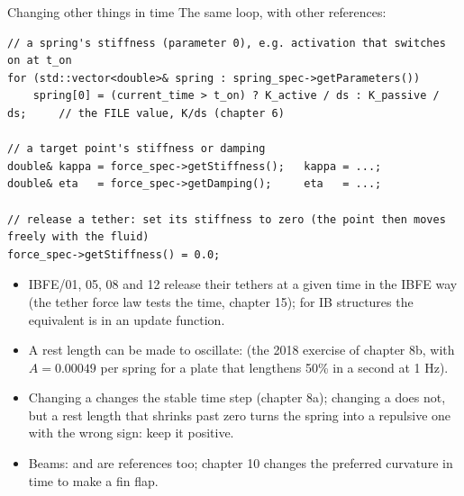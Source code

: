 \documentclass[aspectratio=169,11pt]{beamer}
\begin{document}
\begin{frame}[fragile]{Changing other things in time}
\label{fr:other}
\small The same loop, with other references:
\begin{lstlisting}[style=cpptiny]
// a spring's stiffness (parameter 0), e.g. activation that switches on at t_on
for (std::vector<double>& spring : spring_spec->getParameters())
    spring[0] = (current_time > t_on) ? K_active / ds : K_passive / ds;     // the FILE value, K/ds (chapter 6)

// a target point's stiffness or damping
double& kappa = force_spec->getStiffness();   kappa = ...;
double& eta   = force_spec->getDamping();     eta   = ...;

// release a tether: set its stiffness to zero (the point then moves freely with the fluid)
force_spec->getStiffness() = 0.0;
\end{lstlisting}
\begin{itemize}\footnotesize
  \item IBFE/01, 05, 08 and 12 release their tethers at a given time in the IBFE way (the tether force law tests the time, chapter 15); for IB structures the equivalent is  in an update function.
  \item A rest length can be made to oscillate:  (the 2018 exercise of chapter 8b, with $A = 0.00049$ per spring for a plate that lengthens 50\% in a second at 1 Hz).
  \item Changing a  changes the stable time step (chapter 8a); changing a  does not, but a rest length that shrinks past zero turns the spring into a repulsive one with the wrong sign: keep it positive.
  \item Beams:  and  are references too; chapter 10 changes the preferred curvature in time to make a fin flap.
\end{itemize}
\end{frame}
\end{document}
